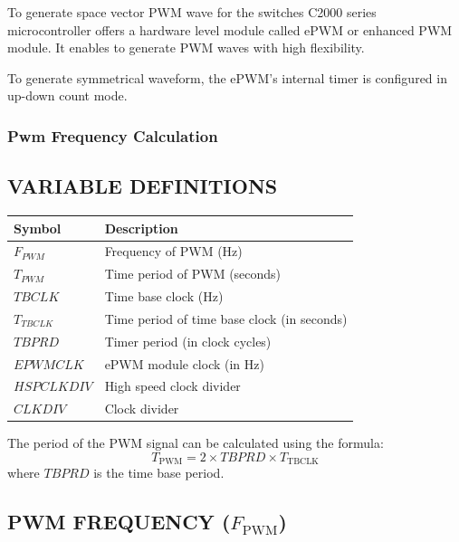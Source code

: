 To generate space vector PWM wave for the switches C2000 series microcontroller offers a hardware level module called ePWM or enhanced PWM module. It enables to generate PWM waves with high flexibility.

To generate symmetrical waveform, the ePWM's internal timer is configured in up-down count mode.

\subsubsection{Pwm Frequency Calculation}

\subsection*{VARIABLE DEFINITIONS}

\renewcommand{\arraystretch}{1.5}
\begin{tabular}{|>{\bfseries}l|l|}
	\hline
	Symbol      & Description                                 \\ \hline
	$F_{PWM}$   & Frequency of PWM (Hz)                       \\ \hline
	$T_{PWM}$   & Time period of PWM (seconds)                \\ \hline
	$TBCLK$     & Time base clock (Hz)                        \\ \hline
	$T_{TBCLK}$ & Time period of time base clock (in seconds) \\ \hline
	$TBPRD$     & Timer period (in clock cycles)              \\ \hline
	$EPWMCLK$   & ePWM module clock (in Hz)                   \\ \hline
	$HSPCLKDIV$ & High speed clock divider                    \\ \hline
	$CLKDIV$    & Clock divider                               \\ \hline
\end{tabular}

\vspace{0.2in}

The period of the PWM signal can be calculated using the formula:
\[
	T_{\text{PWM}} = 2 \times TBPRD \times T_{\text{TBCLK}}
\]
where \( TBPRD \) is the time base period.

\subsection{PWM FREQUENCY (\( F_{\text{PWM}} \))}


